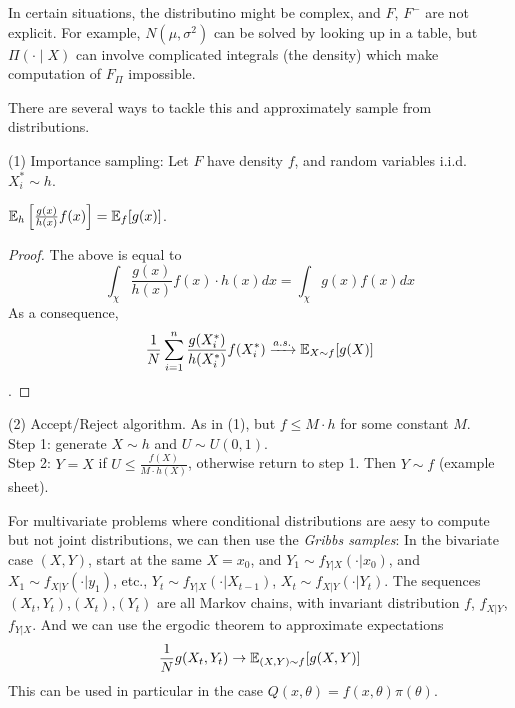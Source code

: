 \documentclass[a4paper]{article}
\begin{document}
In certain situations, the distributino might be complex, and $F$, $F^-$ are not explicit. For example, $N(\mu,\sigma^2)$ can be solved by looking up in a table, but $\Pi (\cdot \mid X)$ can involve complicated integrals (the density) which make computation of $F_\Pi$ impossible.

There are several ways to tackle this and approximately sample from distributions.

(1) Importance sampling: Let $F$ have density $f$, and random variables i.i.d. $X_i^* \sim h$.

\begin{prop}
$\mathbb{E}_h \left[\frac{g(x)}{h(x)} f(x)\right] = \mathbb{E}_f [g(x)]$.
\begin{proof}
The above is equal to $$ \int_\chi \frac{g(x)}{h(x)} f(x) \cdot h(x) dx = \int_\chi g(x) f(x) dx$$ As a consequence, $$\frac{1}{N} \sum_{i=1}^n \frac{g(X_i^*)}{h(X_i^*)} f(X_i^*) \xrightarrow{a.s.} \mathbb{E}_{X \sim f} [g(X)]$$.
\end{proof}
\end{prop}

(2) Accept/Reject algorithm. As in (1), but $f \leq M\cdot h$ for some constant $M$.\\
Step 1: generate $X \sim h$ and $U \sim U(0,1)$.\\
Step 2: $Y=X$ if $U \leq \frac{f(X)}{M\cdot h(X)}$, otherwise return to step 1. Then $Y \sim f$ (example sheet).

For multivariate problems where conditional distributions are aesy to compute but not joint distributions, we can then use the \emph{Gribbs samples}: In the bivariate case $(X,Y)$, start at the same $X = x_0$, and $Y_1 \sim f_{Y|X}(\cdot |x_0)$, and $X_1 \sim f_{X|Y}(\cdot |y_1)$, etc., $Y_t \sim f_{Y|X}(\cdot | X_{t-1})$, $X_t \sim f_{X|Y}(\cdot | Y_t)$. The sequences $(X_t,Y_t)$,$(X_t)$,$(Y_t)$ are all Markov chains, with invariant distribution $f$, $f_{X|Y}$, $f_{Y|X}$. And we can use the ergodic theorem to approximate expectations $$\frac{1}{N} g(X_t,Y_t) \to \mathbb{E}_{(X,Y) \sim f} [g(X,Y)]$$ This can be used in particular in the case $Q(x,\theta) = f(x,\theta) \pi (\theta)$.
\end{document}
